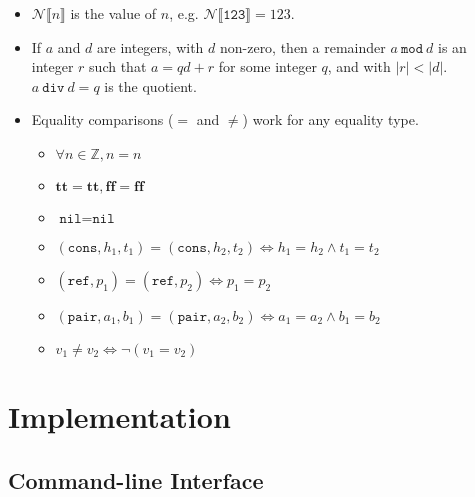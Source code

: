 \documentclass{article}
\newcommand{\btt}{\mathbf{tt}}
\newcommand{\bff}{\mathbf{ff}}
\begin{document}
\begin{itemize}
  \item $\mathcal{N}\llbracket n\rrbracket$ is the value of $n$, e.g. $\mathcal{N}\llbracket\texttt{123}\rrbracket = 123$.
  \item If $a$ and $d$ are integers, with $d$ non-zero, then a remainder $a\ \texttt{mod}\ d$ is an integer $r$ such that $a = qd + r$ for some integer $q$, and with $|r| < |d|$.  $a\ \texttt{div}\ d = q$ is the quotient.
  \item Equality comparisons ($=$ and $\ne$) work for any equality type.
  \begin{itemize}
    \item $\forall n\in\mathbb{Z}, n=n$
    \item $\btt=\btt, \bff=\bff$
    \item $\texttt{nil}=\texttt{nil}$
    \item $(\texttt{cons},h_1,t_1)=(\texttt{cons},h_2,t_2) \iff h_1=h_2\land t_1=t_2$
    \item $(\texttt{ref},p_1)=(\texttt{ref},p_2) \iff p_1=p_2$
    \item $(\texttt{pair},a_1,b_1)=(\texttt{pair},a_2,b_2) \iff a_1=a_2\land b_1=b_2$
    \item $v_1\ne v_2 \iff \lnot(v_1=v_2)$
  \end{itemize}
\end{itemize}


\section{Implementation}

\subsection{Command-line Interface}
\end{document}
